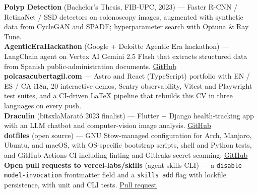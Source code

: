 
\begin{cvparagraph}
    \textbf{Polyp Detection} (Bachelor's Thesis, FIB-UPC, 2023) --- Faster R-CNN / RetinaNet / SSD detectors on colonoscopy images, augmented with synthetic data from CycleGAN and SPADE; hyperparameter search with Optuna \& Ray Tune. \\
    \textbf{AgenticEraHackathon} (Google + Deloitte Agentic Era hackathon) --- LangChain agent on Vertex AI Gemini 2.5 Flash that extracts structured data from Spanish public-administration documents. \href{https://github.com/cuberhaus/AgenticEraHackathon}{GitHub} \\
    \textbf{polcasacubertagil.com} --- Astro and React (TypeScript) portfolio with EN / ES / CA i18n, 20 interactive demos, Sentry observability, Vitest and Playwright test suites, and a CI-driven LaTeX pipeline that rebuilds this CV in three languages on every push. \\
    \textbf{Draculin} (bitsxlaMarató 2023 finalist) --- Flutter + Django health-tracking app with an LLM chatbot and computer-vision image analysis. \href{https://github.com/cuberhaus/Draculin-Backend}{GitHub} \\
    \textbf{dotfiles} (open source) --- GNU Stow-managed configuration for Arch, Manjaro, Ubuntu, and macOS, with OS-specific bootstrap scripts, shell and Python tests, and GitHub Actions CI including linting and Gitleaks secret scanning. \href{https://github.com/cuberhaus/dotfiles}{GitHub} \\
    \textbf{Open pull requests to vercel-labs/skills} (agent skills CLI) --- a \texttt{disable-model-invocation} frontmatter field and a \texttt{skills add} flag with lockfile persistence, with unit and CLI tests. \href{https://github.com/vercel-labs/skills/pull/2498}{Pull request}
\end{cvparagraph}
